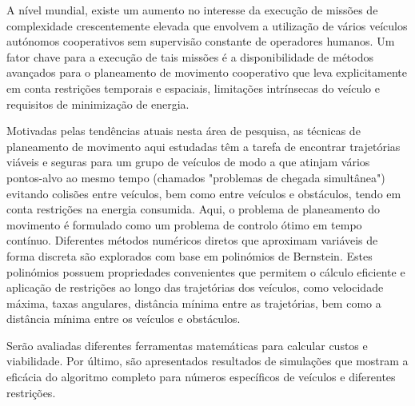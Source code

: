 \noindent 


\par A nível mundial, existe um aumento no interesse da execução de missões de complexidade crescentemente elevada que envolvem a utilização de vários veículos autónomos cooperativos sem supervisão constante de operadores humanos. Um fator chave para a execução de tais missões é a disponibilidade de métodos avançados para o planeamento de movimento cooperativo que leva explicitamente em conta restrições temporais e espaciais, limitações intrínsecas do veículo e requisitos de minimização de energia.
\par Motivadas pelas tendências atuais nesta área de pesquisa, as técnicas de planeamento de movimento aqui estudadas têm a tarefa de encontrar trajetórias viáveis e seguras para um grupo de veículos de modo a que atinjam vários pontos-alvo ao mesmo tempo (chamados "problemas de chegada simultânea") evitando colisões entre veículos, bem como entre veículos e obstáculos, tendo em conta restrições na energia consumida. Aqui, o problema de planeamento do movimento é formulado como um problema de controlo ótimo em tempo contínuo. Diferentes métodos numéricos diretos que aproximam variáveis de forma discreta são explorados com base em polinómios de Bernstein. Estes polinómios possuem propriedades convenientes que permitem o cálculo eficiente e aplicação de restrições ao longo das trajetórias dos veículos, como velocidade máxima, taxas angulares, distância mínima entre as trajetórias, bem como a distância mínima entre os veículos e obstáculos.
\par Serão avaliadas diferentes ferramentas matemáticas para calcular custos e viabilidade. Por último, são apresentados resultados de simulações que mostram a eficácia do algoritmo completo para números específicos de veículos e diferentes restrições.